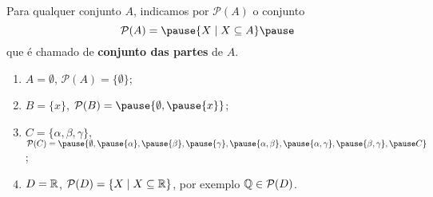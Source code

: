 \documentclass{beamer}
\begin{document}
    \begin{frame}
        \begin{definicao}
            Para qualquer conjunto $A$, \pause indicamos por $\mathcal{P}(A)$ \pause o conjunto\pause
            \[
                \mathcal{P}(A) = \pause \{ X \mid X\subseteq A\}\pause
            \]
            que \'e chamado de \textbf{conjunto das partes} de $A$.\pause
        \end{definicao}


        \begin{exemplos}
            \begin{enumerate}[label={\arabic*})]
                \item $A = \emptyset$, \pause $\mathcal{P}(A) = \{\emptyset\}$;\pause
                \item $B = \{x\}$, \pause $\mathcal{P}(B) = \pause \{\emptyset, \pause \{x\}\}$;\pause
                \item $C = \{\alpha,\beta,\gamma\}$, \pause $\mathcal{P}(C) = \pause \{\emptyset, \pause\{\alpha\}, \pause\{\beta\}, \pause\{\gamma\}, \pause\{\alpha,\beta\}, \pause\{\alpha,\gamma\}, \pause\{\beta,\gamma\}, \pause C\}$;\pause
                \item $D=\mathbb{R}$, \pause $\mathcal{P}(D) = \{X \mid X \subseteq \mathbb{R}\}$, \pause por exemplo $\mathbb{Q} \in \mathcal{P}(D)$.
            \end{enumerate} 
        \end{exemplos}
    \end{frame}
\end{document}
